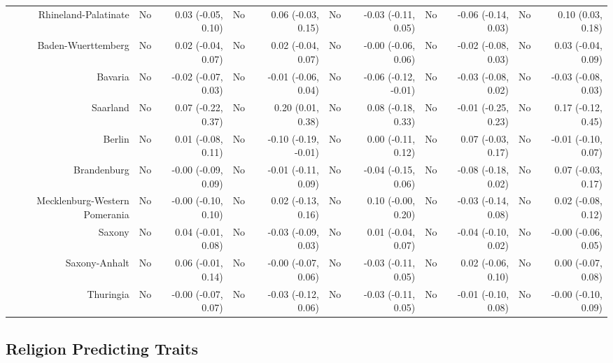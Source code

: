 \documentclass[
  man,floatsintext]{apa6}
\newenvironment{lltable}{\begin{landscape}\centering\begin{ThreePartTable}}{\end{ThreePartTable}\end{landscape}}
\begin{document}
\begin{lltable}
{\begin{longtable}{rrrrrrrrrrr}
Rhineland-Palatinate & No & 0.03 (-0.05, 0.10) & No & 0.06 (-0.03, 0.15) & No & -0.03 (-0.11, 0.05) & No & -0.06 (-0.14, 0.03) & No & 0.10 (0.03, 0.18)\\
Baden-Wuerttemberg & No & 0.02 (-0.04, 0.07) & No & 0.02 (-0.04, 0.07) & No & -0.00 (-0.06, 0.06) & No & -0.02 (-0.08, 0.03) & No & 0.03 (-0.04, 0.09)\\
Bavaria & No & -0.02 (-0.07, 0.03) & No & -0.01 (-0.06, 0.04) & No & -0.06 (-0.12, -0.01) & No & -0.03 (-0.08, 0.02) & No & -0.03 (-0.08, 0.03)\\
Saarland & No & 0.07 (-0.22, 0.37) & No & 0.20 (0.01, 0.38) & No & 0.08 (-0.18, 0.33) & No & -0.01 (-0.25, 0.23) & No & 0.17 (-0.12, 0.45)\\
Berlin & No & 0.01 (-0.08, 0.11) & No & -0.10 (-0.19, -0.01) & No & 0.00 (-0.11, 0.12) & No & 0.07 (-0.03, 0.17) & No & -0.01 (-0.10, 0.07)\\
Brandenburg & No & -0.00 (-0.09, 0.09) & No & -0.01 (-0.11, 0.09) & No & -0.04 (-0.15, 0.06) & No & -0.08 (-0.18, 0.02) & No & 0.07 (-0.03, 0.17)\\
Mecklenburg-Western Pomerania & No & -0.00 (-0.10, 0.10) & No & 0.02 (-0.13, 0.16) & No & 0.10 (-0.00, 0.20) & No & -0.03 (-0.14, 0.08) & No & 0.02 (-0.08, 0.12)\\
Saxony & No & 0.04 (-0.01, 0.08) & No & -0.03 (-0.09, 0.03) & No & 0.01 (-0.04, 0.07) & No & -0.04 (-0.10, 0.02) & No & -0.00 (-0.06, 0.05)\\
Saxony-Anhalt & No & 0.06 (-0.01, 0.14) & No & -0.00 (-0.07, 0.06) & No & -0.03 (-0.11, 0.05) & No & 0.02 (-0.06, 0.10) & No & 0.00 (-0.07, 0.08)\\
Thuringia & No & -0.00 (-0.07, 0.07) & No & -0.03 (-0.12, 0.06) & No & -0.03 (-0.11, 0.05) & No & -0.01 (-0.10, 0.08) & No & -0.00 (-0.10, 0.09)\\
\bottomrule
\end{longtable}

}

\end{lltable}

\subsection{Religion Predicting Traits}\label{religion-predicting-traits}
\end{document}
